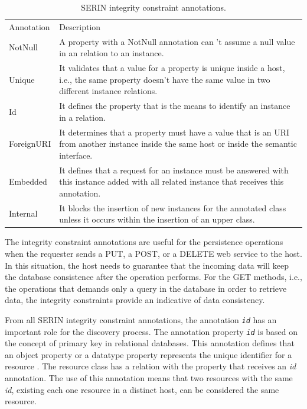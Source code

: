 \documentclass{singlecol-new}
\theoremstyle{TH}{
\newtheorem{lemma}{Lemma}
\newtheorem{theorem}[lemma]{Theorem}
\newtheorem{corrolary}[lemma]{Corrolary}
\newtheorem{conjecture}[lemma]{Conjecture}
\newtheorem{proposition}[lemma]{Proposition}
\newtheorem{claim}[lemma]{Claim}
\newtheorem{stheorem}[lemma]{Wrong Theorem}
\newtheorem{algorithm}{Algorithm}
}
\theoremstyle{THrm}{
\newtheorem{definition}{Definition}[section]
\newtheorem{question}{Question}[section]
\newtheorem{remark}{Remark}
\newtheorem{scheme}{Scheme}
}
\theoremstyle{THhit}{
\newtheorem{case}{Case}[section]
}
\begin{document}
\begin{table}[ht]
	\centering
	\caption{SERIN integrity constraint annotations.}
	\label{tab:integrityannotations}
	\begin{tabular}{lp{10cm}}
		\rowcolor[HTML]{C0C0C0} 
		Annotation & Description                                                                                                                                                \\
		NotNull    & A property with a NotNull annotation can 't assume a null value in an relation to an instance.                                                             \\
		\rowcolor[HTML]{EFEFEF} 
		Unique     & It validates that a value for a property is unique inside a host, i.e., the same property doesn't have the same value in two different instance relations. \\
		Id         & It defines the property that is the means to identify an instance in a relation.                                                                           \\
		\rowcolor[HTML]{EFEFEF} 
		ForeignURI & It determines that a property must have a value that is an URI from another instance inside the same host or inside the semantic interface.                \\
		Embedded   & It defines that a request for an instance must be answered with this instance added with all related instance that receives this annotation.               \\
		\rowcolor[HTML]{EFEFEF} 
		Internal   & It blocks the insertion of new instances for the annotated class unless it occurs within the insertion of an upper class.                                 
	\end{tabular}
\end{table}

The integrity constraint annotations are useful for the persistence operations when the requester sends a PUT, a POST, or a DELETE web service to the host. 
In this situation, the host needs to guarantee that the incoming data will keep the database consistence after the operation performs.
For the GET methods, i.e., the operations that demands only a query in the database in order to retrieve data, the integrity constraints provide an indicative of data consistency. 

From all SERIN integrity constraint annotations, the annotation \texttt{\textit{id}} has an important role for the discovery process. 
The annotation property \texttt{\textit{id}} is based on the concept of primary key in relational databases. 
This annotation defines that an object property or a datatype property represents the unique identifier for a resource \citep{lira2014semantic}. 
The resource class has a relation with the property that receives an \textit{id} annotation.  
The use of this annotation means that two resources with the same \textit{id}, existing each one resource in a distinct host, can be considered the same resource.
\end{document}
